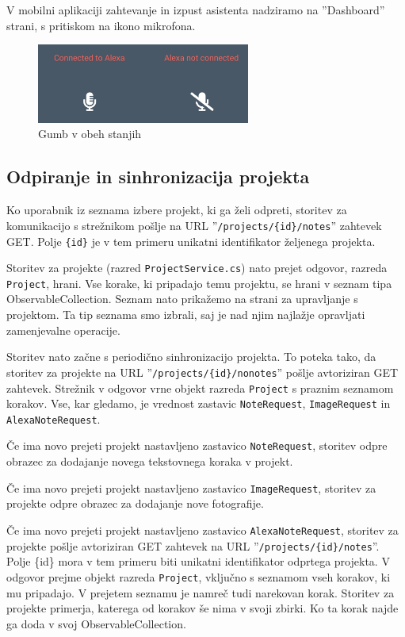 \documentclass[a4paper, 12pt]{book}
\begin{document}
V mobilni aplikaciji zahtevanje in izpust asistenta nadziramo na ''Dashboard'' strani, s pritiskom na ikono mikrofona.

\begin{figure}[H]
\begin{center}
\includegraphics[width=7cm]{app_alexa_yesno}
\end{center}
	\caption{Gumb v obeh stanjih}
\label{app_alexa_yesno}
\end{figure}

\subsection{Odpiranje in sinhronizacija projekta}

Ko uporabnik iz seznama izbere projekt, ki ga želi odpreti, storitev za komunikacijo s strežnikom pošlje na URL ''\texttt{/projects/\{id\}/notes}'' zahtevek GET.
Polje \texttt{\{id\}} je v tem primeru unikatni identifikator željenega projekta.

Storitev za projekte (razred \texttt{ProjectService.cs}) nato prejet odgovor, razreda \texttt{Project}, hrani.
Vse korake, ki pripadajo temu projektu, se hrani v seznam tipa ObservableCollection.
Seznam nato prikažemo na strani za upravljanje s projektom.
Ta tip seznama smo izbrali, saj je nad njim najlažje opravljati zamenjevalne operacije.

Storitev nato začne s periodično sinhronizacijo projekta.
To poteka tako, da storitev za projekte na URL ''\texttt{/projects/\{id\}/nonotes}'' pošlje avtoriziran GET zahtevek.
Strežnik v odgovor vrne objekt razreda \texttt{Project} s praznim seznamom korakov.
Vse, kar gledamo, je vrednost zastavic \texttt{NoteRequest}, \texttt{ImageRequest} in \texttt{AlexaNoteRequest}.

Če ima novo prejeti projekt nastavljeno zastavico \texttt{NoteRequest}, storitev odpre obrazec za dodajanje novega tekstovnega koraka v projekt.

Če ima novo prejeti projekt nastavljeno zastavico \texttt{ImageRequest}, storitev za projekte odpre obrazec za dodajanje nove fotografije.

Če ima novo prejeti projekt nastavljeno zastavico \texttt{AlexaNoteRequest}, storitev za projekte pošlje avtoriziran GET zahtevek na URL ''\texttt{/projects/\{id\}/notes}''.
Polje \{id\} mora v tem primeru biti unikatni identifikator odprtega projekta.
V odgovor prejme objekt razreda \texttt{Project}, vključno s seznamom vseh korakov, ki mu pripadajo.
V prejetem seznamu je namreč tudi narekovan korak.
Storitev za projekte primerja, katerega od korakov še nima v svoji zbirki.
Ko ta korak najde ga doda v svoj ObservableCollection.
\end{document}
